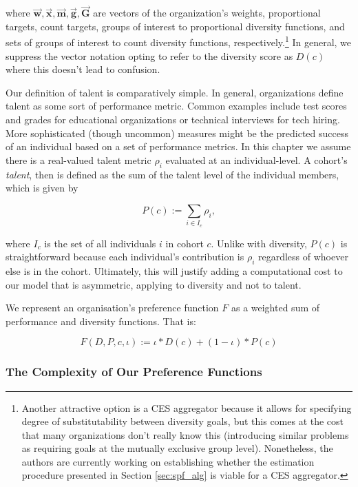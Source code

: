 \noindent where $\vec{\mathbf{w}},\vec{\mathbf{x}}, \vec{\mathbf{m}}, \vec{\mathbf{g}}, \vec{\mathbf{G}}$ are vectors of the organization's weights, proportional targets, count targets, groups of interest to proportional diversity functions, and sets of groups of interest to count diversity functions, respectively.\footnote{Another attractive option is a CES aggregator because it allows for specifying degree of substitutability between diversity goals, but this comes at the cost that many organizations don't really know this (introducing similar problems as requiring goals at the mutually exclusive group level). Nonetheless, the authors are currently working on establishing whether the estimation procedure presented in Section \ref{sec:spf_alg} is viable for a CES aggregator.} In general, we suppress the vector notation opting to refer to the diversity score as $D(c)$ where this doesn't lead to confusion.

Our definition of talent is comparatively simple. In general, organizations define talent as some sort of performance metric. Common examples include test scores and grades for educational organizations or technical interviews for tech hiring. More sophisticated (though uncommon) measures might be the predicted success of an individual based on a set of performance metrics. In this chapter we assume there is a real-valued talent metric $\rho_i$ evaluated at an individual-level. A cohort's \emph{talent}, then is defined as the sum of the talent level of the individual members, which is given by

\begin{equation}
P(c) := \sum_{i \in I_c}\rho_i,
\end{equation}

\noindent where $I_c$ is the set of all individuals $i$ in cohort $c$. Unlike with diversity, $P(c)$ is straightforward because each individual's contribution is $\rho_i$ regardless of whoever else is in the cohort. Ultimately, this will justify adding a computational cost to our model that is asymmetric, applying to diversity and not to talent.

We represent an organisation's preference function $F$ as a weighted sum of performance and diversity functions. That is:

\begin{equation}\label{eq:f_spec}
F(D, P, c, \iota) := \iota*D(c)+(1-\iota)*P(c)
\end{equation}

\subsubsection{The Complexity of Our Preference Functions}


